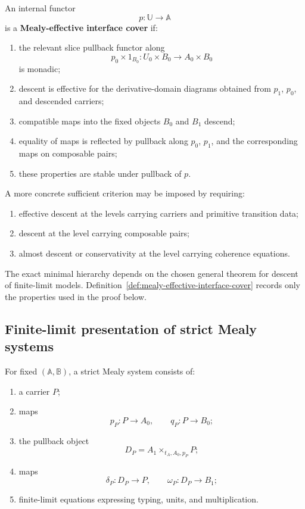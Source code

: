 \begin{definition}
\label{def:mealy-effective-interface-cover}
An internal functor
\[
    p:\mathbb U\to\mathbb A
\]
is a \textbf{Mealy-effective interface cover} if:
\begin{enumerate}
    \item the relevant slice pullback functor along
    \[
        p_0\times 1_{B_0}:
        U_0\times B_0
        \to
        A_0\times B_0
    \]
    is monadic;
    \item descent is effective for the derivative-domain diagrams obtained
    from \(p_1\), \(p_0\), and descended carriers;
    \item compatible maps into the fixed objects \(B_0\) and \(B_1\) descend;
    \item equality of maps is reflected by pullback along \(p_0\), \(p_1\),
    and the corresponding maps on composable pairs;
    \item these properties are stable under pullback of \(p\).
\end{enumerate}
\end{definition}

\begin{remark}
\label{rem:componentwise-sufficient-descent}
A more concrete sufficient criterion may be imposed by requiring:
\begin{enumerate}
    \item effective descent at the levels carrying carriers and primitive
    transition data;
    \item descent at the level carrying composable pairs;
    \item almost descent or conservativity at the level carrying coherence
    equations.
\end{enumerate}
The exact minimal hierarchy depends on the chosen general theorem for descent
of finite-limit models. Definition~\ref{def:mealy-effective-interface-cover}
records only the properties used in the proof below.
\end{remark}

\subsection{Finite-limit presentation of strict Mealy systems}
\label{subsec:finite-limit-presentation-mealy}

For fixed \((\mathbb A,\mathbb B)\), a strict Mealy system consists of:
\begin{enumerate}
    \item a carrier \(P\);
    \item maps
    \[
        p_P:P\to A_0,
        \qquad
        q_P:P\to B_0;
    \]
    \item the pullback object
    \[
        D_P=A_1\times_{t_A,A_0,p_P}P;
    \]
    \item maps
    \[
        \delta_P:D_P\to P,
        \qquad
        \omega_P:D_P\to B_1;
    \]
    \item finite-limit equations expressing typing, units, and
    multiplication.
\end{enumerate}


